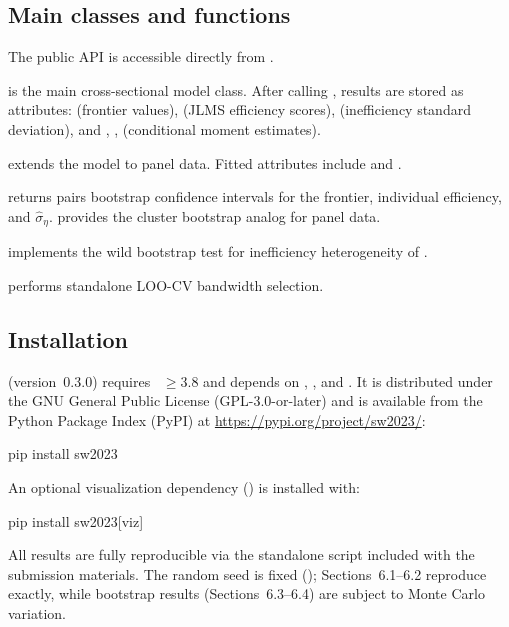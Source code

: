 \documentclass[article]{jss}
\begin{document}
\subsection{Main classes and functions}
\label{sec:api}

The public API is accessible directly from .

 is the
main cross-sectional model class.  After calling ,
results are stored as attributes:  (frontier values),
 (JLMS efficiency scores),
 (inefficiency standard deviation), and
, ,  (conditional moment estimates).

 extends the model to
panel data.  Fitted attributes include  and
.

 returns pairs bootstrap confidence
intervals for the frontier, individual efficiency, and
$\hat{\sigma}_\eta$.   provides the cluster
bootstrap analog for panel data.

 implements the wild bootstrap test
for inefficiency heterogeneity of \citet{PSVKZ2024}.

 performs standalone LOO-CV bandwidth
selection.

\subsection{Installation}
\label{sec:install}

 (version~0.3.0) requires ~$\geq 3.8$ and
depends on  \citep{HarrisEtAl2020},
 \citep{VirtanenEtAl2020}, and  \citep{McKinney2010}.
It is distributed under the GNU General Public License (GPL-3.0-or-later) and is available from the
Python Package Index (PyPI) at \url{https://pypi.org/project/sw2023/}:
%
\begin{Code}
pip install sw2023
\end{Code}
%
An optional visualization dependency () is installed with:
%
\begin{Code}
pip install sw2023[viz]
\end{Code}
%
All results are fully reproducible via the standalone script
 included with the submission materials.
The random seed is fixed (); Sections~6.1--6.2
reproduce exactly, while bootstrap results (Sections~6.3--6.4) are
subject to Monte Carlo variation.
\end{document}
